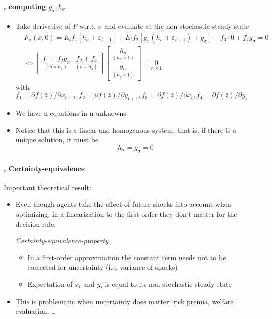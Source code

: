 \documentclass[handout]{beamer}  %
\begin{document}
\begin{frame}
\frametitle{\secname}\framesubtitle{\subsecname, computing $g_\sigma,h_\sigma$}
\begin{itemize}
  \item Take derivative of $F$ w.r.t. $\sigma$ and evaluate at the non-stochastic steady-state
  \footnotesize\begin{eqnarray*}
&F_\sigma(\overline{x},0) = E_t f_1[h_\sigma + \varepsilon_{t+1}] + E_t f_2 [g_x(h_\sigma+ \varepsilon_{t+1})+g_\sigma] + f_3\cdot 0 + f_4 g_\sigma = 0\\
 & \Leftrightarrow \begin{bmatrix} \underset{(n \times n_x)}{f_1 + f_2 g_x} & \underset{(n\times n_y)}{f_2 +f_4}\end{bmatrix} \begin{bmatrix} \underset{(n_x \times 1)}{h_\sigma} \\ \underset{(n_y \times 1)}{g_\sigma} \end{bmatrix} = \underset{n \times 1}{0}
  \end{eqnarray*}
with $f_1=\partial f(\overline{z})/\partial x_{t+1}, f_2=\partial f(\overline{z})/\partial y_{t+1}, f_3=\partial f(\overline{z})/\partial x_{t}, f_4=\partial f(\overline{z})/\partial y_{t}$\normalsize
  \item We have n equations in n unknowns
  \item Notice that this is a linear and homogenous system, that is, if there is a unique solution, it must be $$h_\sigma=g_\sigma=0$$
\end{itemize}
\end{frame}

\begin{frame}
\frametitle{\secname}\framesubtitle{\subsecname, Certainty-equivalence}
Important theoretical result:
\begin{itemize}
  \item Even though agents take the effect of future shocks into account when optimizing, in a linearization to the first-order they don't matter for the decision rule.
\begin{block}{\emph{Certainty-equivalence-property}}
       \begin{itemize}
         \item In a first-order approximation the constant term needs not to be corrected for uncertainty (i.e. variance of shocks)
         \item Expectation of $x_t$ and $y_t$ is equal to its non-stochastic steady-state
       \end{itemize}
\end{block}
\item This is problematic when uncertainty does matter: risk premia, welfare evaluation, \dots
\end{itemize}
\end{frame}
\end{document}
